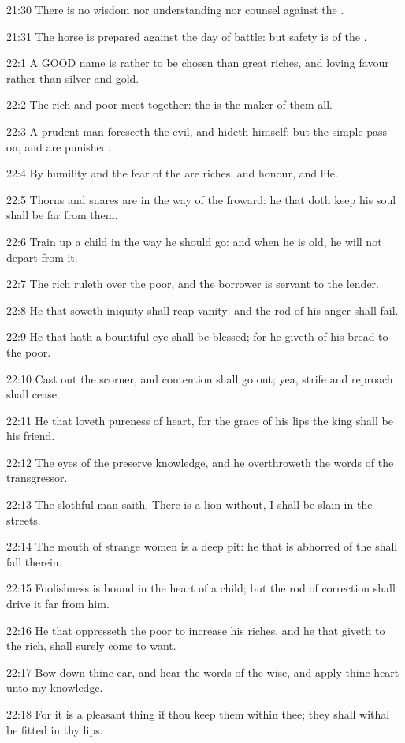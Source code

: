 21:30 There is no wisdom nor understanding nor counsel against the
\LORD.

21:31 The horse is prepared against the day of battle: but safety is
of the \LORD.

22:1 A GOOD name is rather to be chosen than great riches, and loving
favour rather than silver and gold.

22:2 The rich and poor meet together: the \LORD is the maker of them
all.

22:3 A prudent man foreseeth the evil, and hideth himself: but the
simple pass on, and are punished.

22:4 By humility and the fear of the \LORD are riches, and honour, and
life.

22:5 Thorns and snares are in the way of the froward: he that doth
keep his soul shall be far from them.

22:6 Train up a child in the way he should go: and when he is old, he
will not depart from it.

22:7 The rich ruleth over the poor, and the borrower is servant to the
lender.

22:8 He that soweth iniquity shall reap vanity: and the rod of his
anger shall fail.

22:9 He that hath a bountiful eye shall be blessed; for he giveth of
his bread to the poor.

22:10 Cast out the scorner, and contention shall go out; yea, strife
and reproach shall cease.

22:11 He that loveth pureness of heart, for the grace of his lips the
king shall be his friend.

22:12 The eyes of the \LORD preserve knowledge, and he overthroweth the
words of the transgressor.

22:13 The slothful man saith, There is a lion without, I shall be
slain in the streets.

22:14 The mouth of strange women is a deep pit: he that is abhorred of
the \LORD shall fall therein.

22:15 Foolishness is bound in the heart of a child; but the rod of
correction shall drive it far from him.

22:16 He that oppresseth the poor to increase his riches, and he that
giveth to the rich, shall surely come to want.

22:17 Bow down thine ear, and hear the words of the wise, and apply
thine heart unto my knowledge.

22:18 For it is a pleasant thing if thou keep them within thee; they
shall withal be fitted in thy lips.

